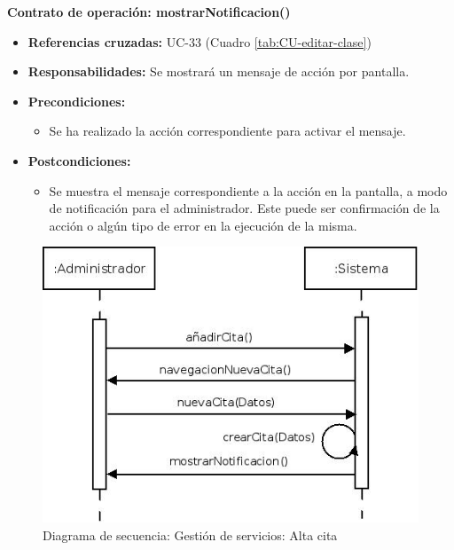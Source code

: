 \textbf{Contrato de operación: mostrarNotificacion()}
\begin{itemize}
\item \textbf{Referencias cruzadas:} UC-33 (Cuadro \ref{tab:CU-editar-clase})
\item \textbf{Responsabilidades:} Se mostrará un mensaje de acción por pantalla.
\item \textbf{Precondiciones:} 
 \begin{itemize}
\item Se ha realizado la acción correspondiente para activar el mensaje.
\end {itemize}
\item \textbf{Postcondiciones:} 
 \begin{itemize}
\item Se muestra el mensaje correspondiente a la acción en la pantalla, a modo de notificación para el administrador. Este puede ser confirmación de la acción o algún tipo de error en la ejecución de la misma.
\end {itemize}
\end {itemize}


\vspace{7mm}
\dotfill
\vspace{7mm}

\begin{figure}[h!]
\centering
  \includegraphics[scale=.55]{img/secuencias/gestion-servicios-alta-cita.jpeg}
  \caption{Diagrama de secuencia: Gestión de servicios: Alta cita}
  \label{fig:secuencia-gestion-servicios-alta-cita}
\end{figure}

